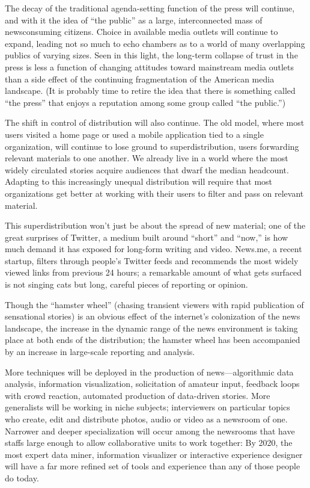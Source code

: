 The decay of the traditional agenda-setting function of the press will continue,
and with it the idea of ``the public'' as a large, interconnected mass of newsconsuming
citizens. Choice in available media outlets will continue to expand,
leading not so much to echo chambers as to a world of many overlapping publics
of varying sizes. Seen in this light, the long-term collapse of trust in the press
is less a function of changing attitudes toward mainstream media outlets than a
side effect of the continuing fragmentation of the American media landscape. (It
is probably time to retire the idea that there is something called ``the press'' that
enjoys a reputation among some group called ``the public.'')

The shift in control of distribution will also continue. The old model, where
most users visited a home page or used a mobile application tied to a single organization,
will continue to lose ground to superdistribution, users forwarding relevant
materials to one another. We already live in a world where the most widely
circulated stories acquire audiences that dwarf the median headcount. Adapting
to this increasingly unequal distribution will require that most organizations get
better at working with their users to filter and pass on relevant material.

This superdistribution won’t just be about the spread of new material; one of the
great surprises of Twitter, a medium built around ``short'' and ``now,'' is how much
demand it has exposed for long-form writing and video. News.me, a recent
startup, filters through people’s Twitter feeds and recommends the most widely
viewed links from previous 24 hours; a remarkable amount of what gets surfaced
is not singing cats but long, careful pieces of reporting or opinion.

Though the ``hamster wheel'' (chasing transient viewers with rapid publication of
sensational stories) is an obvious effect of the internet’s colonization of the news
landscape, the increase in the dynamic range of the news environment is taking
place at both ends of the distribution; the hamster wheel has been accompanied
by an increase in large-scale reporting and analysis.

More techniques will be deployed in the production of news—algorithmic data
analysis, information visualization, solicitation of amateur input, feedback loops
with crowd reaction, automated production of data-driven stories. More generalists
will be working in niche subjects; interviewers on particular topics who create,
edit and distribute photos, audio or video as a newsroom of one. Narrower
and deeper specialization will occur among the newsrooms that have staffs large
enough to allow collaborative units to work together: By 2020, the most expert
data miner, information visualizer or interactive experience designer will have a
far more refined set of tools and experience than any of those people do today.

